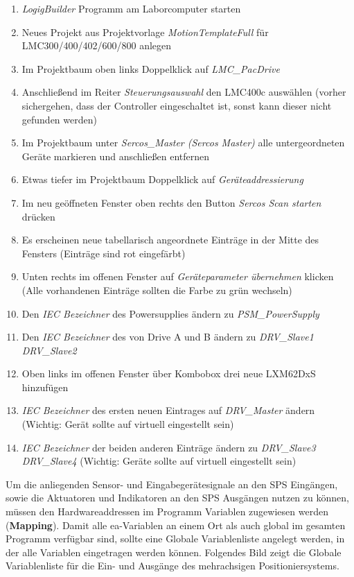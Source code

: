 \documentclass[../../../Bachelorarbeit.tex]{subfiles}
\begin{document}
\begin{enumerate}
    \item \textit{LogigBuilder} Programm am Laborcomputer starten
    \item Neues Projekt aus Projektvorlage \textit{MotionTemplateFull} für LMC300/400/402/600/800 anlegen
    \item Im Projektbaum oben links Doppelklick auf \textit{LMC\_PacDrive}
    \item Anschließend im Reiter \textit{Steuerungsauswahl} den LMC400c auswählen (vorher sichergehen, dass der Controller eingeschaltet ist, sonst kann dieser nicht gefunden werden)
    \item Im Projektbaum unter \textit{Sercos\_Master (Sercos Master)} alle untergeordneten Geräte markieren und anschließen entfernen
    \item Etwas tiefer im Projektbaum Doppelklick auf \textit{Geräteaddressierung}
    \item Im neu geöffneten Fenster oben rechts den Button \textit{Sercos Scan starten} drücken
    \item Es erscheinen neue tabellarisch angeordnete Einträge in der Mitte des Fensters (Einträge sind rot eingefärbt)
    \item Unten rechts im offenen Fenster auf \textit{Geräteparameter übernehmen} klicken (Alle vorhandenen Einträge sollten die Farbe zu grün wechseln)
    \item Den \textit{IEC Bezeichner} des Powersupplies ändern zu \textit{PSM\_PowerSupply}
    \item Den \textit{IEC Bezeichner} des von Drive A und B ändern zu \textit{DRV\_Slave1} \bzw \\ \textit{DRV\_Slave2}
    \item Oben links im offenen Fenster über Kombobox drei neue LXM62DxS hinzufügen
    \item \textit{IEC Bezeichner} des ersten neuen Eintrages auf \textit{DRV\_Master} ändern (Wichtig: Gerät sollte auf virtuell eingestellt sein)
    \item \textit{IEC Bezeichner} der beiden anderen Einträge ändern zu \textit{DRV\_Slave3} \bzw \\ \textit{DRV\_Slave4} (Wichtig: Geräte sollte auf virtuell eingestellt sein)
\end{enumerate}


Um die anliegenden Sensor- und Eingabegerätesignale an den SPS Eingängen, sowie die Aktuatoren und Indikatoren an den SPS Ausgängen nutzen zu können, müssen den Hardwareaddressen im Programm Variablen zugewiesen werden (\eng \textbf{Mapping}). Damit alle \acs{ea}-Variablen an einem Ort als auch global im gesamten Programm verfügbar sind, sollte eine Globale Variablenliste angelegt werden, in der alle Variablen eingetragen werden können. Folgendes Bild zeigt die Globale Variablenliste für die Ein- und Ausgänge des mehrachsigen Positioniersystems.\\
\end{document}
